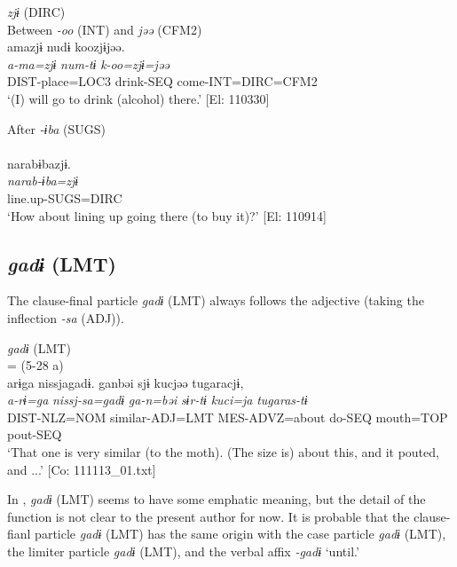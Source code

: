 \begin{xlist}
\ea\label{ex:10.55}   \textit{zjɨ} (DIRC)\\
  \ea Between \textit{{}-oo} (INT) and \textit{jəə} (CFM2)\\
      \glll    amazjɨ  nudɨ  koozjɨjəə.\\
    \textit{a-ma=zjɨ}  \textit{num-tɨ}  \textit{k-oo=zjɨ=jəə}\\
    DIST-place=LOC3  drink-SEQ  come-INT=DIRC=CFM2\\
    \glt     ‘(I) will go to drink (alcohol) there.’ [El: 110330]

  \ex After \textit{{}-ɨba} (SUGS)\\\\
      \glll    narabɨbazjɨ.\\
    \textit{narab-ɨba=zjɨ}\\
    line.up-SUGS=DIRC\\
    \glt     ‘How about lining up going there (to buy it)?’ [El: 110914]
    \z
\z

\subsection{\textit{gadɨ} (LMT)}\label{sec:10.3.10}

The clause-final particle \textit{gadɨ} (LMT) always follows the adjective (taking the inflection \textit{{}-sa} (ADJ)).

\ea\label{ex:10.56}   \textit{gadɨ} (LMT)\\ = (5-28 a)\\
      \glll    arɨga  nissjagadɨ.  ganbəi  sjɨ   kucjəə  tugaracjɨ,\\
    \textit{a-rɨ=ga}  \textit{nissj-sa=gadɨ}  \textit{ga-n=bəi}  \textit{sɨr-tɨ}   \textit{kuci=ja}  \textit{tugaras-tɨ}\\
    DIST-NLZ=NOM  similar-ADJ=LMT  MES-ADVZ=about  do-SEQ   mouth=TOP  pout-SEQ\\
\glt     ‘That one is very similar (to the moth). (The size is) about this, and it pouted, and ...’  [Co: 111113\_01.txt]
\z

In , \textit{gadɨ} (LMT) seems to have some emphatic meaning, but the detail of the function is not clear to the present author for now. It is probable that the clause-fianl particle \textit{gadɨ} (LMT) has the same origin with the case particle \textit{gadɨ} (LMT), the limiter particle \textit{gadɨ} (LMT), and the verbal affix \textit{{}-gadɨ} ‘until.’


\end{xlist}
